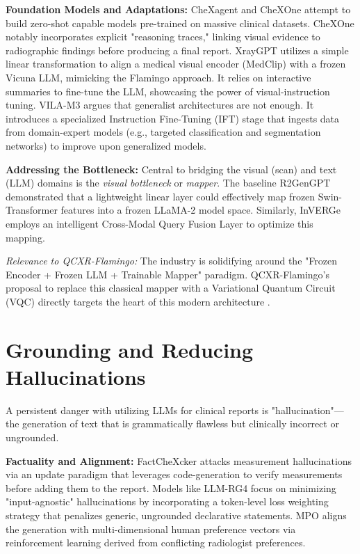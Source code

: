 \documentclass[11pt]{article}
\begin{document}
\textbf{Foundation Models and Adaptations:}
CheXagent \cite{chen2024chexagent} and CheXOne \cite{zhou2026chexone} attempt to build zero-shot capable models pre-trained on massive clinical datasets. CheXOne notably incorporates explicit "reasoning traces," linking visual evidence to radiographic findings before producing a final report. XrayGPT \cite{thawkar2024xraygpt} utilizes a simple linear transformation to align a medical visual encoder (MedClip) with a frozen Vicuna LLM, mimicking the Flamingo approach. It relies on interactive summaries to fine-tune the LLM, showcasing the power of visual-instruction tuning. VILA-M3 \cite{vila2025vilam3} argues that generalist architectures are not enough. It introduces a specialized Instruction Fine-Tuning (IFT) stage that ingests data from domain-expert models (e.g., targeted classification and segmentation networks) to improve upon generalized models.

\textbf{Addressing the Bottleneck:}
Central to bridging the visual (scan) and text (LLM) domains is the \textit{visual bottleneck} or \textit{mapper}. The baseline R2GenGPT \cite{wang2023r2gengpt} demonstrated that a lightweight linear layer could effectively map frozen Swin-Transformer features into a frozen LLaMA-2 model space. Similarly, InVERGe \cite{roy2024inverge} employs an intelligent Cross-Modal Query Fusion Layer to optimize this mapping. 

\textit{Relevance to QCXR-Flamingo:} The industry is solidifying around the "Frozen Encoder + Frozen LLM + Trainable Mapper" paradigm. QCXR-Flamingo's proposal to replace this classical mapper with a Variational Quantum Circuit (VQC) directly targets the heart of this modern architecture \cite{nimi2024qcxr}.

\section{Grounding and Reducing Hallucinations}

A persistent danger with utilizing LLMs for clinical reports is "hallucination"---the generation of text that is grammatically flawless but clinically incorrect or ungrounded.

\textbf{Factuality and Alignment:}
FactCheXcker \cite{factchexcker2025} attacks measurement hallucinations via an update paradigm that leverages code-generation to verify measurements before adding them to the report. Models like LLM-RG4 \cite{wang2025llmrg4} focus on minimizing "input-agnostic" hallucinations by incorporating a token-level loss weighting strategy that penalizes generic, ungrounded declarative statements. MPO \cite{xiao2025mpo} aligns the generation with multi-dimensional human preference vectors via reinforcement learning derived from conflicting radiologist preferences.
\end{document}
